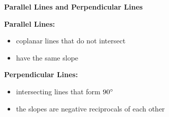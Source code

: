 \begin{center}
\textbf{Parallel Lines and Perpendicular Lines 
}
\end{center}

\vspce

\textbf{Parallel Lines:}
\begin{itemize} 
\item coplanar lines that do not intersect 
\item have the same slope
\end{itemize} 

\vspce 

\textbf{Perpendicular Lines:} 
\begin{itemize} 
\item intersecting lines that form $90\degree$
\item the slopes are negative reciprocals of each other 
\end{itemize} 
 

